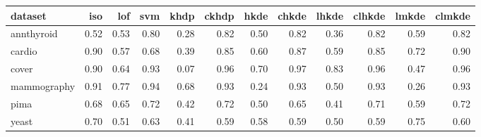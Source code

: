 \begin{table}[ht]
\centering
\begin{tabular}{lrrrrrrrrrrr}
  \hline
dataset & iso & lof & svm & khdp & ckhdp & hkde & chkde & lhkde & clhkde & lmkde & clmkde \\ 
  \hline
annthyroid & 0.52 & 0.53 & 0.80 & 0.28 & 0.82 & 0.50 & 0.82 & 0.36 & 0.82 & 0.59 & 0.82 \\ 
  cardio & 0.90 & 0.57 & 0.68 & 0.39 & 0.85 & 0.60 & 0.87 & 0.59 & 0.85 & 0.72 & 0.90 \\ 
  cover & 0.90 & 0.64 & 0.93 & 0.07 & 0.96 & 0.70 & 0.97 & 0.83 & 0.96 & 0.47 & 0.96 \\ 
  mammography & 0.91 & 0.77 & 0.94 & 0.68 & 0.93 & 0.24 & 0.93 & 0.50 & 0.93 & 0.26 & 0.93 \\ 
  pima & 0.68 & 0.65 & 0.72 & 0.42 & 0.72 & 0.50 & 0.65 & 0.41 & 0.71 & 0.59 & 0.72 \\ 
  yeast & 0.70 & 0.51 & 0.63 & 0.41 & 0.59 & 0.58 & 0.59 & 0.50 & 0.59 & 0.75 & 0.60 \\ 
   \hline
\end{tabular}
\end{table}
